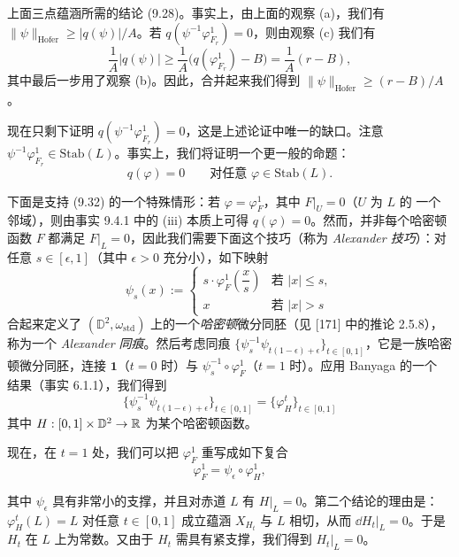 \begin{wproof}
上面三点蕴涵所需的结论 (9.28)。事实上，由上面的观察 (a)，我们有
$\|\psi\|_{\mathrm{Hofer}}\ge|q(\psi)|/A$。若 $q(\psi^{-1}\varphi_{F_r}^1)=0$，则由观察 (c)
我们有
\[
  \frac1A|q(\psi)|\ge\frac1A\big(q(\varphi_{F_r}^1)-B\big)=\frac1A(r-B),
\]
其中最后一步用了观察 (b)。因此，合并起来我们得到
$\|\psi\|_{\mathrm{Hofer}}\ge(r-B)/A$。

现在只剩下证明 $q(\psi^{-1}\varphi_{F_r}^1)=0$，这是上述论证中唯一的缺口。注意
$\psi^{-1}\varphi_{F_r}^1\in\mathrm{Stab}(L)$。事实上，我们将证明一个更一般的命题：
\begin{equation}
  q(\varphi)=0\qquad\text{对任意 }\varphi\in\mathrm{Stab}(L).
  \tag{9.32}
\end{equation}

下面是支持 (9.32) 的一个特殊情形：若 $\varphi=\varphi_F^1$，其中 $F|_U=0$（$U$ 为 $L$ 的
一个邻域），则由事实 9.4.1 中的 (iii) 本质上可得 $q(\varphi)=0$。然而，并非每个哈密顿函数
$F$ 都满足 $F|_L=0$，因此我们需要下面这个技巧（称为 \emph{Alexander 技巧}）：对任意
$s\in[\epsilon,1]$（其中 $\epsilon>0$ 充分小），如下映射
\[
  \psi_s(x):=
  \begin{cases}
    s\cdot\varphi_F^1\left(\dfrac xs\right) & \text{若 } |x|\le s,\\[2mm]
    x & \text{若 } |x|>s
  \end{cases}
\]
合起来定义了 $(\mathbb{D}^2,\omega_{\mathrm{std}})$ 上的一个\emph{哈密顿}微分同胚（见 [171]
中的推论 2.5.8），称为一个 \emph{Alexander 同痕}。然后考虑同痕
$\{\psi_s^{-1}\psi_{t(1-\epsilon)+\epsilon}\}_{t\in[0,1]}$，它是一族哈密顿微分同胚，连接
$\mathbf{1}$（$t=0$ 时）与 $\psi_s^{-1}\circ\varphi_F^1$（$t=1$ 时）。应用 Banyaga 的一个
结果（事实 6.1.1），我们得到
\[
  \{\psi_s^{-1}\psi_{t(1-\epsilon)+\epsilon}\}_{t\in[0,1]}
  =\{\varphi_H^t\}_{t\in[0,1]}
\]
其中 $H:[0,1]\times\mathbb{D}^2\to\mathbb{R}$ 为某个哈密顿函数。

现在，在 $t=1$ 处，我们可以把 $\varphi_F^1$ 重写成如下复合
\begin{equation}
  \varphi_F^1=\psi_\epsilon\circ\varphi_H^1,
  \tag{9.33}
\end{equation}

其中 $\psi_\epsilon$ 具有非常小的支撑，并且对赤道 $L$ 有 $H|_L=0$。第二个结论的理由是：
$\varphi_H^t(L)=L$ 对任意 $t\in[0,1]$ 成立蕴涵 $X_{H_t}$ 与 $L$ 相切，从而
$\dd H_t|_L=0$。于是 $H_t$ 在 $L$ 上为常数。又由于 $H_t$ 需具有紧支撑，我们得到
$H_t|_L=0$。


\end{wproof}
